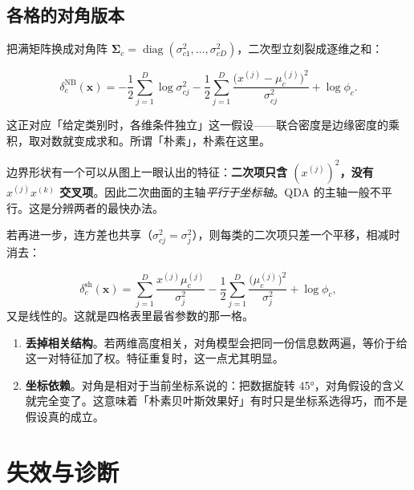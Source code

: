 \documentclass[11pt,a4paper,fontset=windows,zihao=-4]{ctexart}
\newcommand{\bx}{\mathbf{x}}
\newcommand{\bSigma}{\boldsymbol{\Sigma}}
\DeclareMathOperator{\diag}{diag}
\begin{document}
\subsection{各格的对角版本}

把满矩阵换成对角阵 $\bSigma_c=\diag(\sigma_{c1}^2,\dots,\sigma_{cD}^2)$，二次型立刻裂成逐维之和：

\begin{equation}
  \delta_c^{\mathrm{NB}}(\bx)
  =-\frac12\sum_{j=1}^{D}\log\sigma_{cj}^2
  -\frac12\sum_{j=1}^{D}\frac{\bigl(x^{(j)}-\mu_c^{(j)}\bigr)^2}{\sigma_{cj}^2}
  +\log\phi_c .
  \label{eq:gnb}
\end{equation}

这正对应「给定类别时，各维条件独立」这一假设——联合密度是边缘密度的乘积，取对数就变成求和。所谓「朴素」，朴素在这里。

边界形状有一个可以从图上一眼认出的特征：\textbf{二次项只含 $(x^{(j)})^2$，没有 $x^{(j)}x^{(k)}$ 交叉项}。因此二次曲面的主轴\emph{平行于坐标轴}。QDA 的主轴一般不平行。这是分辨两者的最快办法。

若再进一步，连方差也共享（$\sigma_{cj}^2=\sigma_j^2$），则每类的二次项只差一个平移，相减时消去：

\begin{equation}
  \delta_c^{\mathrm{sh}}(\bx)=\sum_{j=1}^{D}\frac{x^{(j)}\mu_c^{(j)}}{\sigma_j^2}
  -\frac12\sum_{j=1}^{D}\frac{\bigl(\mu_c^{(j)}\bigr)^2}{\sigma_j^2}+\log\phi_c ,
  \label{eq:shareddiag}
\end{equation}
又是线性的。这就是四格表里最省参数的那一格。

\begin{add}[对角假设的两个代价]
\begin{enumerate}[label=\textcolor{steel}{\bfseries(\arabic*)},leftmargin=2.2em]
  \item \textbf{丢掉相关结构}。若两维高度相关，对角模型会把同一份信息数两遍，等价于给这一对特征加了权。特征重复时，这一点尤其明显。
  \item \textbf{坐标依赖}。对角是相对于当前坐标系说的：把数据旋转 45°，对角假设的含义就完全变了。这意味着「朴素贝叶斯效果好」有时只是坐标系选得巧，而不是假设真的成立。
\end{enumerate}
\end{add}


\section{失效与诊断}
\end{document}
